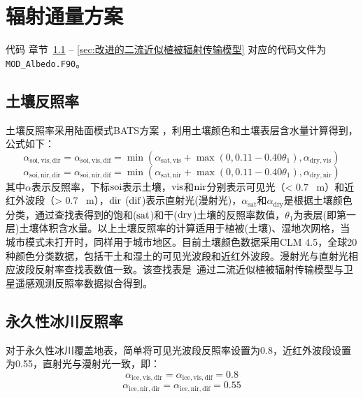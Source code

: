 \chapter{辐射通量方案}

\begin{mymdframed}{代码}
  章节~\ref{sec:土壤反照率} -- \ref{sec:改进的二流近似植被辐射传输模型} 对应的代码文件为\texttt{MOD\_Albedo.F90}。
\end{mymdframed}


\section{土壤反照率}\label{sec:土壤反照率}
土壤反照率采用陆面模式BATS方案 \citep{dickinson1986biosphere,dickinson1993biosphere}，利用土壤颜色和土壤表层含水量计算得到，公式如下：
\begin{equation}\label{eq:soil_albedo1}
  \alpha_{\mathrm{soi,vis,dir}}=\alpha_{\mathrm{soi,vis,dif}}=\min\left(\alpha_{\mathrm{sat, vis}}+\max\left(0,0.11-0.40 \theta_1\right), \alpha_{\mathrm{dry, vis}}\right)
\end{equation}
%
\begin{equation}
  \alpha_{\mathrm{soi,nir,dir}}=\alpha_{\mathrm{soi,nir,dif}}=\min\left(\alpha_{\mathrm{sat, nir}}+\max\left(0,0.11-0.40 \theta_1\right), \alpha_{\mathrm{dry, nir}}\right)
\end{equation}
其中$\alpha$表示反照率，下标$\rm soi$表示土壤，$\rm vis$和$\rm nir$分别表示可见光（< 0.7 \unit{\mu m}）和近红外波段（> 0.7 \unit{\mu m}），$\rm dir$ ($\rm dif$)表示直射光(漫射光)，$\alpha_{\mathrm{sat}}$和$\alpha_{\mathrm{dry}}$是根据土壤颜色分类，通过查找表得到的饱和($\rm sat$)和干($\rm dry$)土壤的反照率数值，$\theta_1$为表层(即第一层)土壤体积含水量。以上土壤反照率的计算适用于植被(土壤)、湿地次网格，当城市模式未打开时，同样用于城市地区。目前土壤颜色数据采用CLM 4.5，全球20种颜色分类数据，包括干土和湿土的可见光波段和近红外波段。漫射光与直射光相应波段反射率查找表数值一致。该查找表是~\citet{lawrence2007representing}通过二流近似植被辐射传输模型与卫星遥感观测反照率数据拟合得到。


\section{永久性冰川反照率}\label{sec:永久性冰川反照率}
对于永久性冰川覆盖地表，简单将可见光波段反照率设置为0.8，近红外波段设置为0.55，直射光与漫射光一致，即：
\begin{equation}
  \alpha_{\mathrm{ice,vis,dir}}=\alpha_{\mathrm{ice,vis,dif}}=0.8
\end{equation}
%
\begin{equation}
  \alpha_{\mathrm{ice,nir,dir}}=\alpha_{\mathrm{ice,nir,dif}}=0.55
\end{equation}

